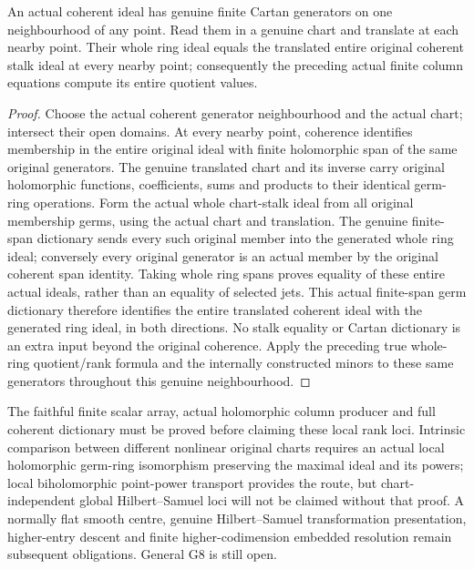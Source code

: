 \begin{theorem}
\label{hir:actual-coherent-whole-point-quotient-column-dictionary}
\leanok
{}
An actual coherent ideal has genuine finite Cartan generators on one
neighbourhood of any point. Read them in a genuine chart and translate
at each nearby point. Their whole ring ideal equals the translated entire
original coherent stalk ideal at every nearby point; consequently the
preceding actual finite column equations compute its entire quotient values.
\end{theorem}
\begin{proof}
Choose the actual coherent generator neighbourhood and the actual chart;
intersect their open domains. At every nearby point, coherence identifies
membership in the entire original ideal with finite holomorphic span of
the same original generators. The genuine translated chart and its inverse
carry original holomorphic functions, coefficients, sums and products to
their identical germ-ring operations. Form the actual whole chart-stalk ideal from all original membership germs,
using the actual chart and translation. The genuine finite-span dictionary
sends every such original member into the generated whole ring ideal;
conversely every original generator is an actual member by the original
coherent span identity. Taking whole ring spans proves equality of these
entire actual ideals, rather than an equality of selected jets. This
actual finite-span germ dictionary therefore identifies the entire translated coherent ideal with the generated
ring ideal, in both directions. No stalk equality or Cartan dictionary is
an extra input beyond the original coherence. Apply the preceding true
whole-ring quotient/rank formula and the internally constructed minors to
these same generators throughout this genuine neighbourhood.
\end{proof}

\begin{remark}
The faithful finite scalar array, actual holomorphic column producer and
full coherent dictionary must be proved before claiming these local
rank loci. Intrinsic comparison between different nonlinear original charts
requires an actual local holomorphic germ-ring isomorphism preserving the
maximal ideal and its powers; local biholomorphic point-power transport
provides the route, but chart-independent global Hilbert--Samuel loci will
not be claimed without that proof. A normally flat smooth centre, genuine
Hilbert--Samuel transformation presentation, higher-entry descent and finite
higher-codimension embedded resolution remain subsequent obligations.
General G8 is still open.
\end{remark}
